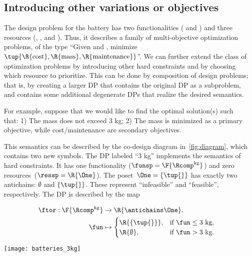 \subsection{Introducing other variations or objectives}

The design problem for the battery has two functionalities (
and ) and three resources (, ,
and ). Thus, it describes a family of multi-objective
optimization problems, of the type ``Given  and ,
minimize $\tup{ \R{\text{cost}},\R{\text{mass}},\R{\text{maintenance}}} $''.
We can further extend the class of optimization problems by introducing
other hard constraints and by choosing which resource to prioritize.
This can be done by composition of design problems; that is, by creating
a larger DP that contains the original DP as a subproblem, and contains
some additional degenerate DPs that realize the desired semantics.

For example, suppose that we would like to find the optimal solution(s)
such that: 1) The mass does not exceed 3 kg; 2) The mass is minimized
as a primary objective, while cost/maintenance are secondary objectives.

This semantics can be described by the co-design diagram in~\cref{fig:diagram},
which contains two new symbols. The DP labeled ``3 kg'' implements
the semantics of hard constraints. It has one functionality ($\funsp=\F{\Rcomp^{\text{kg}}}$)
and zero resources~($\ressp=\R{\One}$). The poset~$\One=\{\tup{ } \}$
has exactly two antichains: $\emptyset$ and $\{\tup{ } \}$.
These represent ``infeasible'' and ``feasible'', respectively.
The DP is described by the map

\quad\quad
\begin{minipage}[c]{5cm}
  \begin{align*}
    \ftor:\F{\Rcomp^{\text{kg}}} & \rightarrow\R{\antichains\One},\\
    \fun& \mapsto\begin{cases}
                   \R{\{\tup{ } \}}, & \text{if }\fun\leq\text{3 kg},\\
                   \R{\emptyset}, & \text{if }\fun>\text{3 kg}.
    \end{cases}
  \end{align*}

\end{minipage}\quad\texttt{[image: batteries\_3kg]}

\smallskip{}


